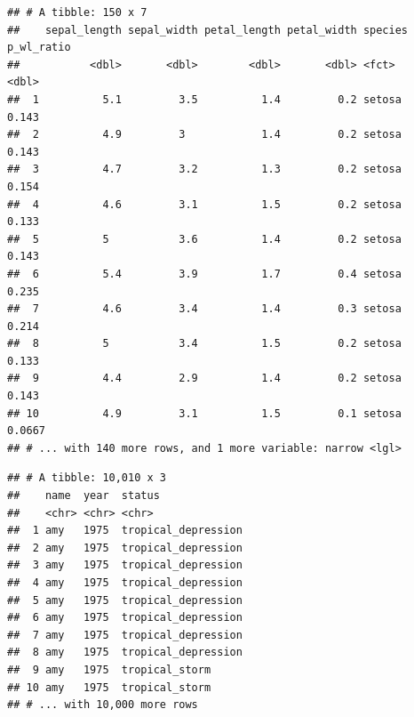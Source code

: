 \documentclass[]{article}
\newenvironment{Shaded}{\begin{snugshade}}{\end{snugshade}}
\newcommand{\CommentTok}[1]{\textcolor[rgb]{0.56,0.35,0.01}{\textit{#1}}}
\newcommand{\KeywordTok}[1]{\textcolor[rgb]{0.13,0.29,0.53}{\textbf{#1}}}
\newcommand{\NormalTok}[1]{#1}
\newcommand{\OperatorTok}[1]{\textcolor[rgb]{0.81,0.36,0.00}{\textbf{#1}}}
\newcommand{\StringTok}[1]{\textcolor[rgb]{0.31,0.60,0.02}{#1}}
\begin{document}
\begin{verbatim}
## # A tibble: 150 x 7
##    sepal_length sepal_width petal_length petal_width species p_wl_ratio
##           <dbl>       <dbl>        <dbl>       <dbl> <fct>        <dbl>
##  1          5.1         3.5          1.4         0.2 setosa      0.143 
##  2          4.9         3            1.4         0.2 setosa      0.143 
##  3          4.7         3.2          1.3         0.2 setosa      0.154 
##  4          4.6         3.1          1.5         0.2 setosa      0.133 
##  5          5           3.6          1.4         0.2 setosa      0.143 
##  6          5.4         3.9          1.7         0.4 setosa      0.235 
##  7          4.6         3.4          1.4         0.3 setosa      0.214 
##  8          5           3.4          1.5         0.2 setosa      0.133 
##  9          4.4         2.9          1.4         0.2 setosa      0.143 
## 10          4.9         3.1          1.5         0.1 setosa      0.0667
## # ... with 140 more rows, and 1 more variable: narrow <lgl>
\end{verbatim}

\begin{Shaded}
\end{Shaded}

\begin{verbatim}
## # A tibble: 10,010 x 3
##    name  year  status             
##    <chr> <chr> <chr>              
##  1 amy   1975  tropical_depression
##  2 amy   1975  tropical_depression
##  3 amy   1975  tropical_depression
##  4 amy   1975  tropical_depression
##  5 amy   1975  tropical_depression
##  6 amy   1975  tropical_depression
##  7 amy   1975  tropical_depression
##  8 amy   1975  tropical_depression
##  9 amy   1975  tropical_storm     
## 10 amy   1975  tropical_storm     
## # ... with 10,000 more rows
\end{verbatim}
\end{document}

